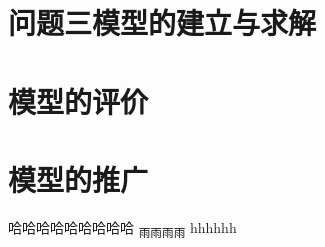 \documentclass[withoutpreface,bwprint]{cumcmthesis} %
\begin{document}
\section{问题三模型的建立与求解}
 
\section{模型的评价}

\section{模型的推广}
哈哈哈哈哈哈哈哈哈\cite{luojiawei2019latex}
\textsubscript{雨雨雨雨}
hhhhhh\cite{yue}
 
\begin{thebibliography}{9}%
    

\bibitem[3]{}

\bibitem[4]{}

\bibitem[5]{}

\bibitem[6]{}

\bibitem[7]{}

\bibitem[8]{}

\end{thebibliography}
\end{document}
